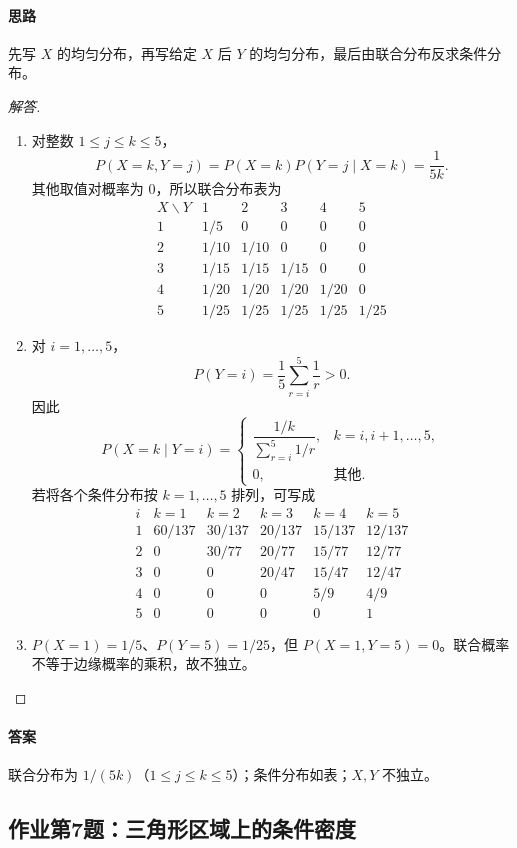 \paragraph{思路}先写 $X$ 的均匀分布，再写给定 $X$ 后 $Y$ 的均匀分布，最后由联合分布反求条件分布。
\begin{proof}[解答]
\begin{enumerate}[label=(\alph*)]
\item 对整数 $1\leq j\leq k\leq5$，
\[
P(X=k,Y=j)=P(X=k)P(Y=j\mid X=k)=\frac1{5k}.
\]
其他取值对概率为 $0$，所以联合分布表为
\[
\begin{array}{c|ccccc}
X\backslash Y&1&2&3&4&5\\\hline
1&1/5&0&0&0&0\\
2&1/10&1/10&0&0&0\\
3&1/15&1/15&1/15&0&0\\
4&1/20&1/20&1/20&1/20&0\\
5&1/25&1/25&1/25&1/25&1/25
\end{array}
\]
\item 对 $i=1,\ldots,5$，
\[
P(Y=i)=\frac15\sum_{r=i}^5\frac1r>0.
\]
因此
\[
P(X=k\mid Y=i)=
\begin{cases}
\dfrac{1/k}{\sum_{r=i}^5 1/r},& k=i,i+1,\ldots,5,\\
0,&\text{其他}.
\end{cases}
\]
若将各个条件分布按 $k=1,\ldots,5$ 排列，可写成
\[
\begin{array}{c|ccccc}
i&k=1&k=2&k=3&k=4&k=5\\\hline
1&60/137&30/137&20/137&15/137&12/137\\
2&0&30/77&20/77&15/77&12/77\\
3&0&0&20/47&15/47&12/47\\
4&0&0&0&5/9&4/9\\
5&0&0&0&0&1
\end{array}
\]
\item $P(X=1)=1/5$、$P(Y=5)=1/25$，但 $P(X=1,Y=5)=0$。联合概率不等于边缘概率的乘积，故不独立。
\end{enumerate}
\end{proof}
\paragraph{答案}联合分布为 $1/(5k)$（$1\leq j\leq k\leq5$）；条件分布如表；$X,Y$ 不独立。

\subsection{作业第7题：三角形区域上的条件密度}\label{ex:w11-h7}
